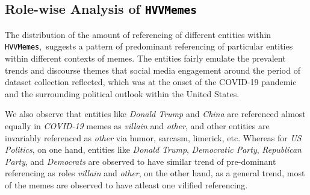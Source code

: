 \documentclass[11pt]{article}
\newcommand{\dataset}{\textcolor{black}{\texttt{HVVMemes}}}
\begin{document}
\subsection{Role-wise Analysis of \dataset}



The distribution of the amount of referencing of different entities within \dataset,\ suggests a pattern of predominant referencing of particular entities within different contexts of memes. The entities fairly emulate the prevalent trends and discourse themes that social media engagement around the period of dataset collection reflected, which was at the onset of the COVID-19 pandemic and the surrounding political outlook within the United States.   



We also observe that entities like \textit{Donald Trump} and \textit{China} are referenced almost equally in \textit{COVID-19} memes as \textit{villain} and \textit{other}, and other entities are invariably referenced as \textit{other} via humor, sarcasm, limerick, etc. Whereas for \textit{US Politics}, on one hand, entities like \textit{Donald Trump}, \textit{Democratic Party}, \textit{Republican Party}, and \textit{Democrats} are observed to have similar trend of pre-dominant referencing as roles \textit{villain} and \textit{other}, on the other hand, as a general trend, most of the memes are observed to have atleast one vilified referencing. 
\end{document}
